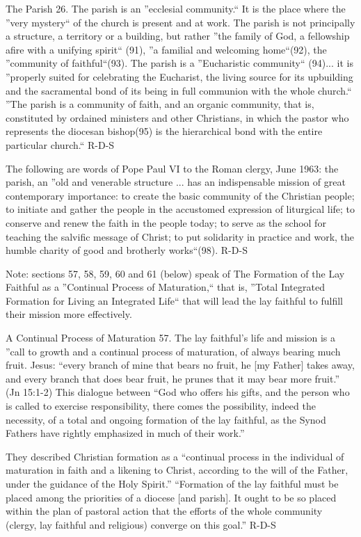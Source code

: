 \documentclass[oneside]{book}
\begin{document}
The Parish
26. The parish is an ''ecclesial community.`` It is the place where the ''very
mystery`` of the church is present and at work. The parish is not principally a
structure, a territory or a building, but rather ''the family of God, a
fellowship afire with a unifying spirit`` (91), ''a familial and welcoming
home``(92), the ''community of faithful``(93). The parish is a ''Eucharistic
community`` (94)... it is ''properly suited for celebrating the Eucharist, the
living source for its upbuilding and the sacramental bond of its being in full
communion with the whole church.``
''The parish is a community of faith, and an organic community, that is,
constituted by ordained ministers and other Christians, in which the pastor who
represents the diocesan bishop(95) is the hierarchical bond with the entire
particular church.``
R-D-S

The following are words of Pope Paul VI to the Roman clergy, June 1963: the
parish, an ''old and venerable structure ... has an indispensable mission of
great contemporary importance: to create the basic community of the Christian
people; to initiate and gather the people in the accustomed expression of
liturgical life; to conserve and renew the faith in the people today; to serve
as the school for teaching the salvific message of Christ; to put solidarity in
practice and work, the humble charity of good and brotherly works``(98).
R-D-S

Note: sections 57, 58, 59, 60 and 61 (below) speak of The Formation of the Lay
Faithful as a ''Continual Process of Maturation,`` that is, ''Total Integrated
Formation for Living an Integrated Life`` that will lead the lay faithful to
fulfill their mission more effectively.

A Continual Process of Maturation
57. The lay faithful's life and mission is a ''call to growth and a continual
process of maturation, of always bearing much fruit. Jesus: ``every branch of
mine that bears no fruit, he [my Father] takes away, and every branch that does
bear fruit, he prunes that it may bear more fruit.'' (Jn 15:1-2)
This dialogue between ``God who offers his gifts, and the person who is called
to exercise responsibility, there comes the possibility, indeed the necessity,
of a total and ongoing formation of the lay faithful, as the Synod Fathers have
rightly emphasized in much of their work.''

They described Christian formation as a ``continual process in the individual of
maturation in faith and a likening to Christ, according to the will of the
Father, under the guidance of the Holy Spirit.'' ``Formation of the lay faithful
must be placed among the priorities of a diocese [and parish]. It ought to be so
placed within the plan of pastoral action that the efforts of the whole
community (clergy, lay faithful and religious) converge on this goal.'' 
R-D-S
\end{document}
